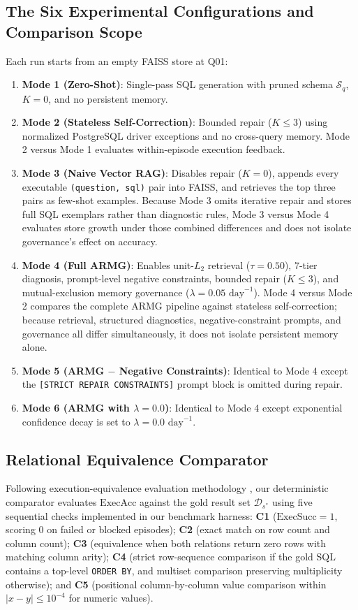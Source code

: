 \subsection{The Six Experimental Configurations and Comparison Scope}
Each run starts from an empty FAISS store at Q01:
\begin{enumerate}
\item \textbf{Mode 1 (Zero-Shot)}: Single-pass SQL generation with pruned schema $\mathcal{S}_q$, $K=0$, and no persistent memory.
\item \textbf{Mode 2 (Stateless Self-Correction)}: Bounded repair ($K \le 3$) using normalized PostgreSQL driver exceptions and no cross-query memory. Mode 2 versus Mode 1 evaluates within-episode execution feedback.
\item \textbf{Mode 3 (Naive Vector RAG)}: Disables repair ($K=0$), appends every executable \texttt{(question, sql)} pair into FAISS, and retrieves the top three pairs as few-shot examples. Because Mode 3 omits iterative repair and stores full SQL exemplars rather than diagnostic rules, Mode 3 versus Mode 4 evaluates store growth under those combined differences and does not isolate governance's effect on accuracy.
\item \textbf{Mode 4 (Full ARMG)}: Enables unit-$L_2$ retrieval ($\tau = 0.50$), 7-tier diagnosis, prompt-level negative constraints, bounded repair ($K \le 3$), and mutual-exclusion memory governance ($\lambda = 0.05\text{ day}^{-1}$). Mode 4 versus Mode 2 compares the complete ARMG pipeline against stateless self-correction; because retrieval, structured diagnostics, negative-constraint prompts, and governance all differ simultaneously, it does not isolate persistent memory alone.
\item \textbf{Mode 5 (ARMG $-$ Negative Constraints)}: Identical to Mode 4 except the \texttt{[STRICT REPAIR CONSTRAINTS]} prompt block is omitted during repair.
\item \textbf{Mode 6 (ARMG with $\lambda = 0.0$)}: Identical to Mode 4 except exponential confidence decay is set to $\lambda = 0.0\text{ day}^{-1}$.
\end{enumerate}

\subsection{Relational Equivalence Comparator}
\label{sec:comparator}
Following execution-equivalence evaluation methodology \cite{finegandollak2018eval, zhong2020distilled}, our deterministic comparator evaluates $\text{ExecAcc}$ against the gold result set $\mathcal{D}_{s^*}$ using five sequential checks implemented in our benchmark harness: \textbf{C1} ($\text{ExecSucc} = 1$, scoring $0$ on failed or blocked episodes); \textbf{C2} (exact match on row count and column count); \textbf{C3} (equivalence when both relations return zero rows with matching column arity); \textbf{C4} (strict row-sequence comparison if the gold SQL contains a top-level \texttt{ORDER BY}, and multiset comparison preserving multiplicity otherwise); and \textbf{C5} (positional column-by-column value comparison within $|x - y| \le 10^{-4}$ for numeric values).

